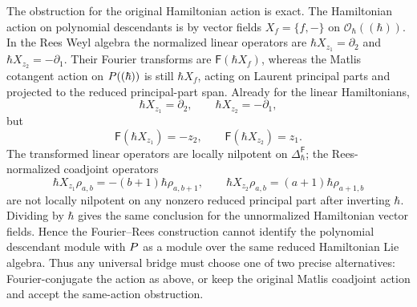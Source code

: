 \begin{thm}
  The obstruction for the original Hamiltonian action is exact.  The
  Hamiltonian action on polynomial descendants is by vector fields
  \(X_f=\{f,-\}\) on \(\mathcal O_\hbar((\hbar))\).  In the Rees Weyl
  algebra the normalized linear operators are
  \(\hbar X_{z_1}=\partial_2\) and
  \(\hbar X_{z_2}=-\partial_1\).  Their Fourier transforms are
  \(\mathsf F(\hbar X_f)\), whereas the Matlis cotangent action on
  \(P((\hbar))\) is still \(\hbar X_f\), acting on Laurent
  principal parts and projected to the reduced principal-part span.
  Already for the linear Hamiltonians,
  \[
    \hbar X_{z_1}=\partial_2,\qquad
    \hbar X_{z_2}=-\partial_1,
  \]
  but
  \[
    \mathsf F(\hbar X_{z_1})=-z_2,\qquad
    \mathsf F(\hbar X_{z_2})=z_1 .
  \]
  The transformed linear operators are locally nilpotent on
  \(\Delta^{\mathsf F}_\hbar\); the Rees-normalized coadjoint operators
  \[
    \hbar X_{z_1}\rho_{a,b}=-(b+1)\hbar\rho_{a,b+1},\qquad
    \hbar X_{z_2}\rho_{a,b}=(a+1)\hbar\rho_{a+1,b}
  \]
  are not locally nilpotent on any nonzero reduced principal part after
  inverting \(\hbar\).  Dividing by \(\hbar\) gives the same conclusion
  for the unnormalized Hamiltonian vector fields.  Hence the
  Fourier--Rees construction cannot identify the polynomial descendant
  module with \(P\) as a module over the same reduced Hamiltonian Lie
  algebra.  Thus any universal bridge must choose one of two precise
  alternatives: Fourier-conjugate the action as above, or keep the original
  Matlis coadjoint action and accept the same-action obstruction.
\end{thm}

